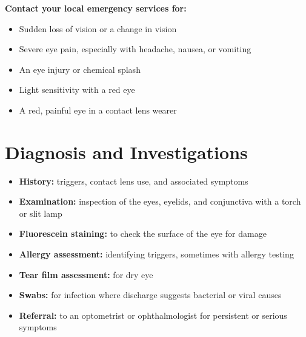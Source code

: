 \textbf{Contact your local emergency services for:}
\begin{itemize}
    \item Sudden loss of vision or a change in vision
    \item Severe eye pain, especially with headache, nausea, or vomiting
    \item An eye injury or chemical splash
    \item Light sensitivity with a red eye
    \item A red, painful eye in a contact lens wearer
\end{itemize}

\section*{Diagnosis and Investigations}
\begin{itemize}
    \item \textbf{History:} triggers, contact lens use, and associated symptoms
    \item \textbf{Examination:} inspection of the eyes, eyelids, and conjunctiva with a torch or slit lamp
    \item \textbf{Fluorescein staining:} to check the surface of the eye for damage
    \item \textbf{Allergy assessment:} identifying triggers, sometimes with allergy testing
    \item \textbf{Tear film assessment:} for dry eye
    \item \textbf{Swabs:} for infection where discharge suggests bacterial or viral causes
    \item \textbf{Referral:} to an optometrist or ophthalmologist for persistent or serious symptoms
\end{itemize}

